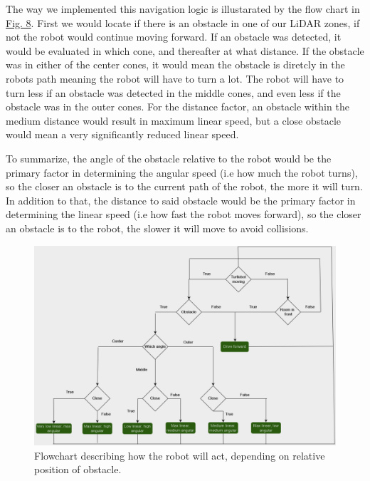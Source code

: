 \documentclass[conference]{IEEEtran}
\begin{document}
The way we implemented this navigation logic is illustarated by the flow chart in \href{sec:flowchart}{Fig. 8}. 
First we would locate if there is an obstacle in one of our LiDAR zones, if not the robot would continue moving forward.
If an obstacle was detected, it would be evaluated in which cone, and thereafter at what distance.
If the obstacle was in either of the center cones, it would mean the obstacle is diretcly in the robots path meaning the robot will have to turn a lot.
The robot will have to turn less if an obstacle was detected in the middle cones, and even less if the obstacle was in the outer cones.
For the distance factor, an obstacle within the medium distance would result in maximum linear speed, but a close obstacle would mean a very significantly reduced linear speed.

To summarize, the angle of the obstacle relative to the robot would be the primary factor in determining the angular speed (i.e how much the robot turns), so the closer an obstacle is to the current path of the robot, the more it will turn.
In addition to that, the distance to said obstacle would be the primary factor in determining the linear speed (i.e how fast the robot moves forward), so the closer an obstacle is to the robot, the slower it will move to avoid collisions.

\begin{figure}[b]
    \centerline{\includegraphics[width=1.0\columnwidth]{Pictures/Flowchart.png}}
    \caption{Flowchart describing how the robot will act, depending on relative position of obstacle.}
    \label{sec:flowchart}
    \end{figure}
\end{document}
